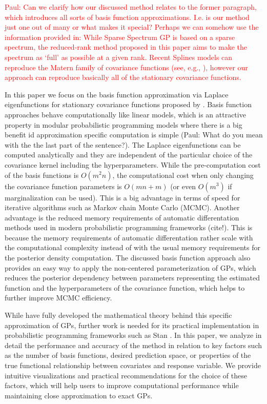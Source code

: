 \documentclass[]{interact}
\theoremstyle{plain}%
\theoremstyle{definition}
\theoremstyle{remark}
\begin{document}
\textcolor{red}{Paul: Can we clarify how our discussed method relates to the former paragraph,
which introduces all sorts of basis function approximations. I.e. is our method
just one out of many or what makes it special? Perhaps we can somehow use the information provided
in: While Sparse Spectrum GP is based on a sparse spectrum, the reduced-rank method proposed in this paper aims to make the spectrum as ‘full’ as possible at a given rank. Recent Splines models can reproduce the Matern family of covariance functions (see, e.g., \cite{wood2003thin}), however our approach can reproduce basically all of the stationary covariance functions.}

In this paper we focus on the basis function approximation via Laplace eigenfunctions for stationary covariance functions proposed by \citet{solin2018hilbert}. Basis function approaches behave computationally like linear models, which is an attractive property in modular probabilistic programming models where there is a big benefit id approximation specific computation is simple (Paul: What do you mean with the the last part of the sentence?). The Laplace eigenfunctions can be computed analytically and they are independent of the particular choice of the covariance kernel including the hyperparameters. While the pre-computation cost of the basis functions is $O(m^2n)$, the computational cost when only changing the covariance function parameters is $O(mn+m)$ (or even $O(m^3)$ if marginalization can be used). This is a big advantage in terms of speed for iterative algorithms such as Markov chain Monte Carlo (MCMC). Another advantage is the reduced memory requirements of automatic differentation methods used in modern probabilistic programming frameworks (cite!). This is because the memory requirements of automatic differentation rather scale with the computational complexity instead of with the usual memory requirements for the posterior density computation. The discussed basis function approach also provides an easy way to apply the non-centered parameterization of GPs, which reduces the posterior dependency between parameters representing the estimated function and the hyperparameters of the covariance function, which helps to further improve MCMC efficiency.

While \citet{solin2018hilbert} have fully developed the mathematical theory behind this specific approximation of GPs, further work is needed for its practical implementation in probabilistic programming frameworks such as Stan \citep{carpenter2017stan}. In this paper, we analyze in detail the performance and accuracy of the method in relation to key factors such as the number of basis functions, desired prediction space, or properties of the true functional relationship between covariates and response variable. We provide intuitive visualizations and practical recommendations for the choice of these factors, which will help users to improve computational performance while maintaining close approximation to exact GPs. 
\end{document}
